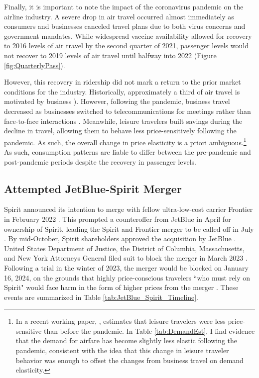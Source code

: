 \documentclass{article}
\begin{document}
	Finally, it is important to note the impact of the coronavirus pandemic on the airline industry.  A severe drop in air travel occurred almost immediately as consumers and businesses canceled travel plans due to both virus concerns and government mandates. While widespread vaccine availability allowed for recovery to 2016 levels of air travel by the second quarter of 2021, passenger levels would not recover to 2019 levels of air travel until halfway into 2022 (Figure \ref{fig:QuarterlyPass}). 

	However, this recovery in ridership did not mark a return to the prior market conditions for the industry. Historically, approximately a third of air travel is motivated by business \citep{berry_tracing_2010, bet_market_2021}). However, following the pandemic, business travel decreased as businesses switched to telecommunications for meetings rather than face-to-face interactions \citep{semuels_business_2021}. Meanwhile, leisure travelers built savings during the decline in travel, allowing them to behave less price-sensitively following the pandemic. As such, the overall change in price elasticity is a priori ambiguous.\footnote{In a recent working paper, \citet{ewen_zoom_2023}, estimates that leisure travelers were less price-sensitive than before the pandemic. In Table \ref{tab:DemandEst}, I find evidence that the demand for airfare has become slightly less elastic following the pandemic, consistent with the idea that this change in leisure traveler behavior was enough to offset the changes from business travel on demand elasticity.}  As such, consumption patterns are liable to differ between the pre-pandemic and post-pandemic periods despite the recovery in passenger levels. 

    
	\subsection{Attempted JetBlue-Spirit Merger}
	\label{sec:Setting_Merger}
	Spirit announced its intention to merge with fellow ultra-low-cost carrier Frontier in February 2022 \citep{schaper_frontier-spirit_2022}. This prompted a counteroffer from JetBlue in April for ownership of Spirit, leading the Spirit and Frontier merger to be called off in July \citep{josephs_jetblue_2022, josephs_spirit_2022}. By mid-October, Spirit shareholders approved the acquisition by JetBlue \citep{koenig_spirit_2022}.  United States Department of Justice, the District of Columbia, Massachusetts, and New York Attorneys General filed suit to block the merger in March 2023 \citep{chokshi_justice_2023}. Following a trial in the winter of 2023, the merger would be blocked on January 16, 2024, on the grounds that highly price-conscious travelers ``who must rely on Spirit" would face harm in the form of higher prices from the merger \citep{william_g_young_findings_2024}. These events are summarized in Table \ref{tab:JetBlue_Spirit_Timeline}. 
\end{document}
